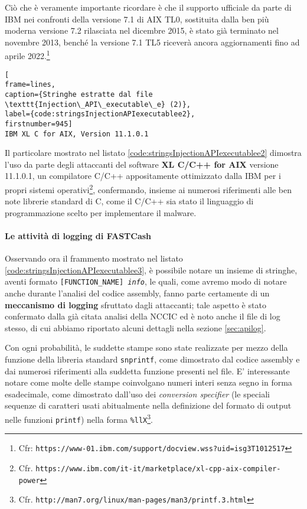 \documentclass[10pt,a4paper, titlepage]{report}
\begin{document}
Ciò che è veramente importante ricordare è che il supporto ufficiale da parte di IBM nei confronti della versione 7.1 di AIX TL0, sostituita dalla ben più moderna versione 7.2 rilasciata nel dicembre 2015, è stato già terminato nel novembre 2013, benché la versione 7.1 TL5 riceverà ancora aggiornamenti fino ad aprile 2022.\footnote{Cfr: \texttt{https://www-01.ibm.com/support/docview.wss?uid=isg3T1012517}}

\begin{lstlisting}[
frame=lines, 
caption={Stringhe estratte dal file \texttt{Injection\_API\_executable\_e} (2)}, 
label={code:stringsInjectionAPIexecutablee2},
firstnumber=945]
IBM XL C for AIX, Version 11.1.0.1
\end{lstlisting}

Il particolare mostrato nel listato \ref{code:stringsInjectionAPIexecutablee2} dimostra l'uso da parte degli attaccanti del software \textbf{XL C/C++ for AIX} versione 11.1.0.1, un compilatore C/C++ appositamente ottimizzato dalla IBM per i propri sistemi operativi\footnote{Cfr. \texttt{https://www.ibm.com/it-it/marketplace/xl-cpp-aix-compiler-power}}, confermando, insieme ai numerosi riferimenti alle ben note librerie standard di C, come il C/C++ sia stato il linguaggio di programmazione scelto per implementare il malware.

\paragraph{Le attività di logging di FASTCash}

Osservando ora il frammento mostrato nel listato \ref{code:stringsInjectionAPIexecutablee3}, è possibile notare un insieme di stringhe, aventi formato \texttt{[FUNCTION\_NAME] \textit{info}}, le quali, come avremo modo di notare anche durante l'analisi del codice assembly, fanno parte certamente di un \textbf{meccanismo di logging} sfruttato dagli attaccanti; tale aspetto è stato confermato dalla già citata analisi della NCCIC ed è noto anche il file di log stesso, di cui abbiamo riportato alcuni dettagli nella sezione \ref{sec:apilog}.

Con ogni probabilità, le suddette stampe sono state realizzate per mezzo della funzione della libreria standard \texttt{snprintf}, come dimostrato dal codice assembly e dai numerosi riferimenti alla suddetta funzione presenti nel file. E' interessante notare come molte delle stampe coinvolgano numeri interi senza segno in forma esadecimale, come dimostrato dall'uso dei \textit{conversion specifier} (le speciali sequenze di caratteri usati abitualmente nella definizione del formato di output nelle funzioni \texttt{printf}) nella forma \texttt{\%llX}\footnote{Cfr. \texttt{http://man7.org/linux/man-pages/man3/printf.3.html}}.
\end{document}
